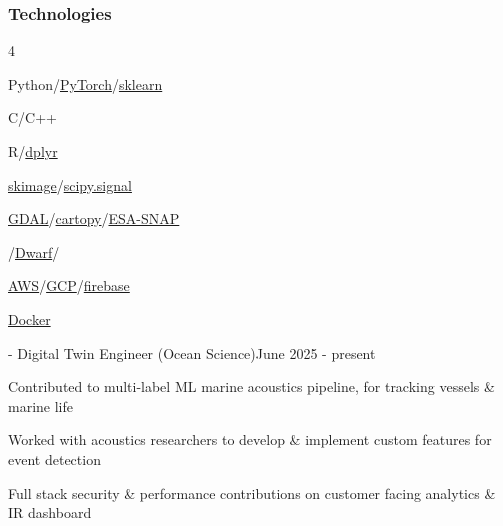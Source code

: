 \documentclass{article}
\newenvironment{mylist}[2]{
  \subsubsection*{#1}
  \begin{multicols}{#2}
  \small
  \begin{list}{}{}
   \setlength{\topsep}{0pt}
   \setlength{\itemsep}{1pt}
   \setlength{\parskip}{0pt}
   \setlength{\parsep}{0pt}}{\end{list}\end{multicols}\normalsize}
\newenvironment{**mylist}[2]{

\subsubsection*{#1\hfill#2}
  \small
  \begin{list}{}{}
    \setlength{\topsep}{0pt}
   \setlength{\itemsep}{1pt}
   \setlength{\parskip}{0pt}
   \setlength{\parsep}{0pt}}{\end{list}\normalsize}
\def\bsp{-.3in}
\begin{document}
\begin{mylist}{Technologies}{4}
\item Python/\href{https://pytorch.org/}{PyTorch}/\href{https://scikit-learn.org/stable/}{sklearn}
\item C/C++
\item R/\href{https://dplyr.tidyverse.org/}{dplyr}
\item \href{https://scikit-image.org/}{skimage}/\href{https://scipy.github.io/devdocs/reference/signal.html#module-scipy.signal}{scipy.signal}
\item \href{https://gdal.org/en/stable/}{GDAL}/\href{https://scitools.org.uk/cartopy/docs/latest/}{cartopy}/\href{https://step.esa.int/main/download/snap-download/}{ESA-SNAP}
\item \href{https://pypi.org/project/gtirb/}{}/\href{https://dwarfstd.org/}{Dwarf}/\href{https://pypi.org/project/asts/}{}
\item \href{https://aws.amazon.com/}{AWS}/\href{https://cloud.google.com/}{GCP}/\href{https://firebase.google.com/}{firebase}
\item \href{https://www.docker.com/}{Docker}
\end{mylist}

\newcommand{\BSec}[1]{
\noindent{\hspace{\bsp} \LARGE{\bf #1}{ }\hrulefill}}
\TabPositions{2.0in} %
\def\tabb{\tab- }  %

\BSec{}%
\begin{**mylist}{\href{https://blueoasis.pt/}{} \tabb Digital Twin Engineer (Ocean Science)}{June 2025 - present}
\item Contributed to multi-label ML marine acoustics pipeline, for tracking vessels \& marine life
\item Worked with acoustics researchers to develop \& implement custom features for event detection
\item Full stack security \& performance contributions on customer facing analytics \& IR dashboard
\end{**mylist}
\end{document}
